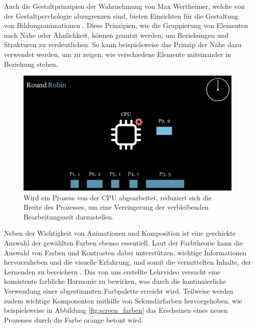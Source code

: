 Auch die Gestaltprinzipien der Wahrnehmung von Max Wertheimer, welche von der Gestaltpsychologie abzugrenzen sind, bieten Einsichten für die Gestaltung von Bildungsanimationen \autocite{wertheimer_untersuchungen_2017}. Diese Prinzipien, wie die Gruppierung von Elementen nach Nähe oder Ähnlichkeit, können genutzt werden, um Beziehungen und Strukturen zu verdeutlichen. So kann beispielsweise das Prinzip der Nähe dazu verwendet werden, um zu zeigen, wie verschiedene Elemente miteinander in Beziehung stehen. 

\begin{figure}[h]
	\centering
	\includegraphics[width=0.8\linewidth]{img/screen_komposition.png} 
	\caption{Wird ein Prozess von der \ac{CPU} abgearbeitet, reduziert sich die Breite des Prozesses, um eine Verringerung der verbleibenden Bearbeitungszeit darzustellen.}
	\label{fig:screen_komposition} 
\end{figure}


Neben der Wichtigkeit von Animationen und Komposition ist eine geschickte Auswahl der gewählten Farben ebenso essentiell. Laut der Farbtheorie kann die Auswahl von Farben und Kontrasten dabei unterstützen, wichtige Informationen hervorzuheben und die visuelle Erfahrung, und somit die vermittelten Inhalte, der Lernenden zu bereichern \autocite{ballard_art_1964}. Das von uns erstellte Lehrvideo versucht eine konsistente farbliche Harmonie zu bewirken, was durch die kontinuierliche Verwendung einer abgestimmten Farbpalette erreicht wird. Teilweise werden zudem wichtige Komponenten mithilfe von Sekundärfarben hervorgehoben, wie beispielsweise in Abbildung \ref{fig:screen_farben} das Erscheinen eines neuen Prozesses durch die Farbe orange betont wird. 

